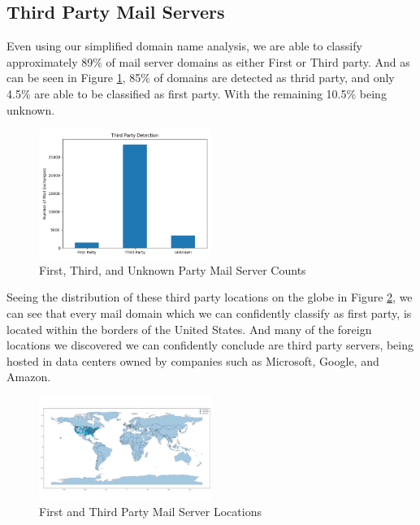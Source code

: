 \documentclass{hotnets21}
\begin{document}
\subsection{Third Party Mail Servers}

Even using our simplified domain name analysis, we are able to classify approximately 89\% of mail server domains as either First or Third party.
And as can be seen in Figure \ref{fig:thirdpartysummary}, 85\% of domains are detected as thrid party, and only 4.5\% are able to be classified as first party.
With the remaining 10.5\% being unknown.

\begin{figure}
\label{fig:thirdpartysummary}
\noindent\includegraphics[width=0.5\textwidth]{Summary/Third Party Exchanges.png}
\caption{First, Third, and Unknown Party Mail Server Counts}
\end{figure}

Seeing the distribution of these third party locations on the globe in Figure \ref{fig:thirdpartyglobe}, we can see that every mail domain which we can confidently classify as first party, is located within the borders of the United States.
And many of the foreign locations we discovered we can confidently conclude are third party servers, being hosted in data centers owned by companies such as Microsoft, Google, and Amazon.

\begin{figure}
\label{fig:thirdpartyglobe}
\noindent\includegraphics[width=0.5\textwidth]{Summary/Globe Third Party.png}
\caption{First and Third Party Mail Server Locations}
\end{figure}
\end{document}
